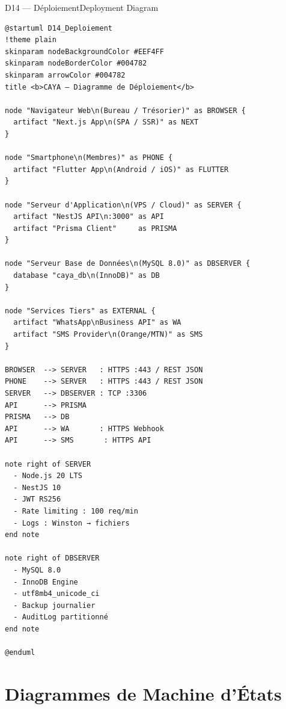 \documentclass[12pt, a4paper]{report}
\begin{document}
\begin{diagramBox}{D14 — Déploiement}{Deployment Diagram}
\begin{lstlisting}
@startuml D14_Deploiement
!theme plain
skinparam nodeBackgroundColor #EEF4FF
skinparam nodeBorderColor #004782
skinparam arrowColor #004782
title <b>CAYA — Diagramme de Déploiement</b>

node "Navigateur Web\n(Bureau / Trésorier)" as BROWSER {
  artifact "Next.js App\n(SPA / SSR)" as NEXT
}

node "Smartphone\n(Membres)" as PHONE {
  artifact "Flutter App\n(Android / iOS)" as FLUTTER
}

node "Serveur d'Application\n(VPS / Cloud)" as SERVER {
  artifact "NestJS API\n:3000" as API
  artifact "Prisma Client"     as PRISMA
}

node "Serveur Base de Données\n(MySQL 8.0)" as DBSERVER {
  database "caya_db\n(InnoDB)" as DB
}

node "Services Tiers" as EXTERNAL {
  artifact "WhatsApp\nBusiness API" as WA
  artifact "SMS Provider\n(Orange/MTN)" as SMS
}

BROWSER  --> SERVER   : HTTPS :443 / REST JSON
PHONE    --> SERVER   : HTTPS :443 / REST JSON
SERVER   --> DBSERVER : TCP :3306
API      --> PRISMA
PRISMA   --> DB
API      --> WA       : HTTPS Webhook
API      --> SMS       : HTTPS API

note right of SERVER
  - Node.js 20 LTS
  - NestJS 10
  - JWT RS256
  - Rate limiting : 100 req/min
  - Logs : Winston → fichiers
end note

note right of DBSERVER
  - MySQL 8.0
  - InnoDB Engine
  - utf8mb4_unicode_ci
  - Backup journalier
  - AuditLog partitionné
end note

@enduml
\end{lstlisting}
\end{diagramBox}

\chapter{Diagrammes de Machine d'États}
\end{document}
